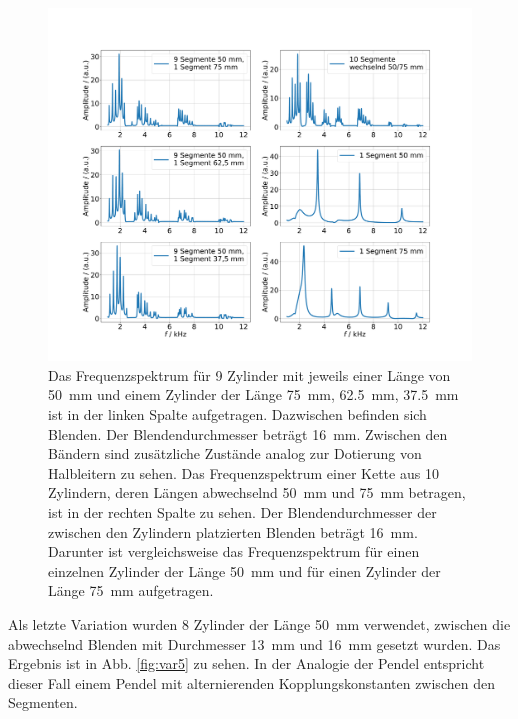 \begin{figure}
    \centering
    \includegraphics[width=\textwidth]{plots/B_5.pdf}
    \caption{Das Frequenzspektrum für 9 Zylinder mit jeweils einer Länge von \SI{50}{\milli\metre} und einem Zylinder der Länge \SI{75}{\milli\metre}, \SI{62.5}{\milli\metre}, \SI{37.5}{\milli\metre} ist in der linken Spalte aufgetragen. Dazwischen befinden sich Blenden. Der Blendendurchmesser beträgt \SI{16}{\milli\metre}. Zwischen den Bändern sind zusätzliche Zustände analog zur Dotierung von Halbleitern zu sehen. %
    Das Frequenzspektrum einer Kette aus 10 Zylindern, deren Längen abwechselnd \SI{50}{\milli\metre} und \SI{75}{\milli\metre} betragen, ist in der rechten Spalte zu sehen. Der Blendendurchmesser der zwischen den Zylindern platzierten Blenden beträgt \SI{16}{\milli\metre}. Darunter ist vergleichsweise das Frequenzspektrum für einen einzelnen Zylinder der Länge \SI{50}{\milli\metre} und für einen Zylinder der Länge \SI{75}{\milli\metre} aufgetragen.}
    \label{fig:var4}
\end{figure}

Als letzte Variation wurden \num{8} Zylinder der Länge \SI{50}{\milli\metre} verwendet, zwischen die abwechselnd Blenden mit Durchmesser \SI{13}{\milli\metre} und \SI{16}{\milli\metre} gesetzt wurden. 
Das Ergebnis ist in Abb. \ref{fig:var5} zu sehen. In der Analogie der Pendel entspricht dieser Fall einem Pendel mit alternierenden Kopplungskonstanten zwischen den Segmenten.

